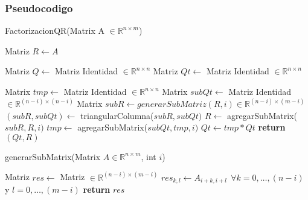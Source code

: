 \subsubsection{Pseudocodigo}

\begin{algorithm}[H]
\caption{FactorizacionQR(Matrix A $\in \mathbb{R}^{n \times m}$)}
\label{pseudo:Factorizacion-QR}
\begin{algorithmic}

\STATE Matriz $R \leftarrow A$

\STATE Matriz $Q \leftarrow$ Matriz Identidad $\in \mathbb{R}^{n \times n}$
\STATE Matriz $Qt \leftarrow$ Matriz Identidad $\in \mathbb{R}^{n \times n}$

    \STATE Matrix $tmp \leftarrow$ Matriz Identidad $\in \mathbb{R}^{n \times n}$
    \STATE Matrix $subQt \leftarrow$ Matriz Identidad $\in \mathbb{R}^{(n-i) \times (n-i)}$
    \STATE Matrix $subR \leftarrow generarSubMatriz(R,i) \in \mathbb{R}^{(n-i) \times (m-i)}$
    \STATE $(subR, subQt) \leftarrow$ triangularColumna($subR, subQt)$
    \STATE $R \leftarrow$ agregarSubMatrix($subR, R, i)$
    \STATE $tmp \leftarrow$ agregarSubMatrix($subQt, tmp, i)	$
    \ENDIF
	\STATE $Qt \leftarrow tmp*Qt$
\ENDFOR
\STATE \textbf{return} $(Qt, R)$
\end{algorithmic}
\end{algorithm}


\begin{algorithm}[H]
\caption{generarSubMatrix(Matrix $A \in \mathbb{R}^{n \times m}$, int $i$)}
\label{pseudo:generar-sub-matrix}
\begin{algorithmic}
\STATE Matriz $res \leftarrow$ Matriz $\in \mathbb{R}^{(n-i) \times (m-i)}$
\STATE $res_{k,l} \leftarrow A_{i+k,i+l} \ \ \forall k=0,\ldots,(n-i)$ y $l=0,\ldots,(m-i)$
\STATE \textbf{return} $res$
\end{algorithmic}
\end{algorithm}



